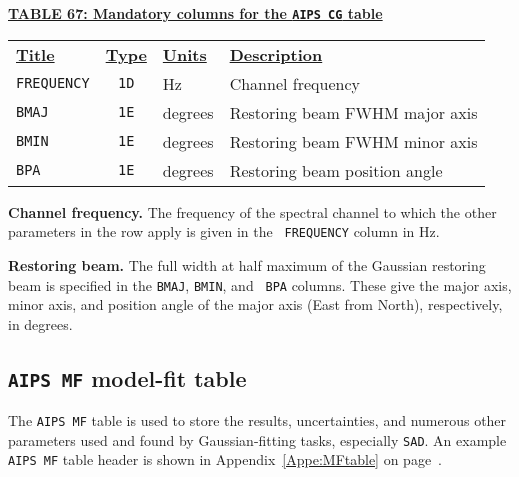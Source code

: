 \documentclass[twoside]{article}
\begin{document}
\begin{center}
\underline{\bf{TABLE 67: Mandatory columns for the {\tt AIPS CG} table}}\\
\begin{tabular}{lcll}
\noalign{\vspace{2pt}} \label{ta:CGcols}
\underline{{\bf Title\vphantom{y}}} & \underline{\bf{Type}} &
   \underline{{\bf Units\vphantom{y}}} & \underline{\bf{Description}} \\
\noalign{\vspace{2pt}}
{\tt FREQUENCY} & {\tt 1D} & Hz      & Channel frequency \\
{\tt BMAJ}      & {\tt 1E} & degrees & Restoring beam FWHM major axis \\
{\tt BMIN}      & {\tt 1E} & degrees & Restoring beam FWHM minor axis \\
{\tt BPA}       & {\tt 1E} & degrees & Restoring beam position angle
\end{tabular}
\end{center}

{\bf Channel frequency.} The frequency of the spectral channel to
which the other parameters in the row apply is given in the {\tt
  FREQUENCY} column in Hz.

{\bf Restoring beam.} The full width at half maximum of the Gaussian
restoring beam is specified in the {\tt BMAJ}, {\tt BMIN}, and {\tt
  BPA} columns.  These give the major axis, minor axis, and position
angle of the major axis (East from North), respectively, in degrees.

\subsection{{\tt AIPS MF} model-fit table}
\label{s:MF}

The {\tt AIPS MF} table is used to store the results, uncertainties,
and numerous other parameters used and found by Gaussian-fitting
tasks, especially {\tt SAD}\@.  An example {\tt AIPS MF} table header
is shown in Appendix~\ref{Appe:MFtable} on
page~\pageref{Appe:MFtable}.
\end{document}
